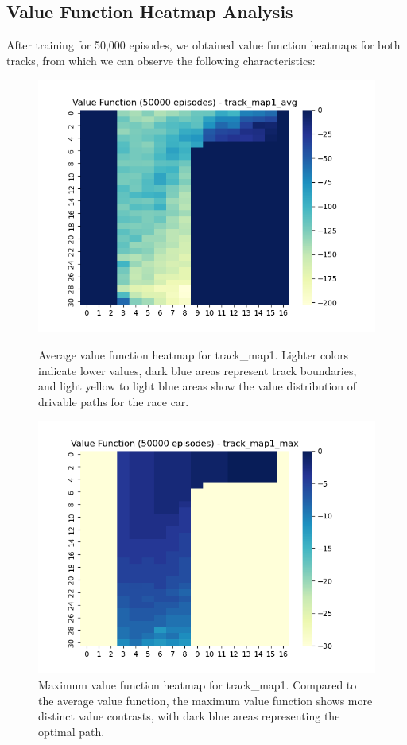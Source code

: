 \documentclass{article}
\begin{document}
\subsection{Value Function Heatmap Analysis}
After training for 50,000 episodes, we obtained value function heatmaps for both tracks, from which we can observe the following characteristics:

\begin{figure}[H]
    \centering
    \begin{minipage}{0.48\textwidth}
        \includegraphics[width=\textwidth]{grid1_1.png}
        \caption{Average value function heatmap for track\_map1. Lighter colors indicate lower values, dark blue areas represent track boundaries, and light yellow to light blue areas show the value distribution of drivable paths for the race car.}
    \end{minipage}
    \hfill
    \begin{minipage}{0.48\textwidth}
        \includegraphics[width=\textwidth]{grid1_2.png}
        \caption{Maximum value function heatmap for track\_map1. Compared to the average value function, the maximum value function shows more distinct value contrasts, with dark blue areas representing the optimal path.}
    \end{minipage}
\end{figure}
\end{document}
